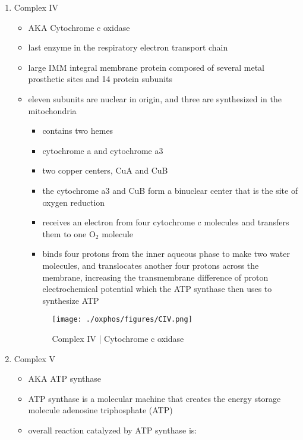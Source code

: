 \documentclass{scrartcl}
\begin{document}
\begin{enumerate}
\begin{itemize}
{\small{}}
\end{itemize}

\item Complex IV
\label{sec:orga498c3b}
\begin{itemize}
\item AKA Cytochrome c oxidase
\item last enzyme in the respiratory electron transport chain
\item large IMM integral membrane protein composed of several metal prosthetic sites and 14 protein subunits
\item eleven subunits are nuclear in origin, and three are synthesized in the mitochondria
\begin{itemize}
\item contains two hemes
\item cytochrome a and cytochrome a3
\item two copper centers, CuA and CuB
\item the cytochrome a3 and CuB form a binuclear center that is the site of oxygen reduction
\item receives an electron from four cytochrome c molecules and
transfers them to one O\(_{\text{2}}\) molecule
\end{itemize}

{\small{}}

\begin{itemize}
\item binds four protons from the inner aqueous phase to make two water
molecules, and translocates another four protons across the
membrane, increasing the transmembrane difference of proton
electrochemical potential which the ATP synthase then uses to
synthesize ATP
\end{itemize}

\begin{figure}[htbp]
\centering
\texttt{[image: ./oxphos/figures/CIV.png]}
\caption[cIV]{\label{fig:org7596689}
Complex IV | Cytochrome c oxidase}
\end{figure}
\end{itemize}

\item Complex V
\label{sec:org58f09da}
\begin{itemize}
\item AKA ATP synthase
\item ATP synthase is a molecular machine that creates the energy storage
molecule adenosine triphosphate (ATP)
\item overall reaction catalyzed by ATP synthase is:
\end{itemize}


\end{enumerate}
\end{document}
